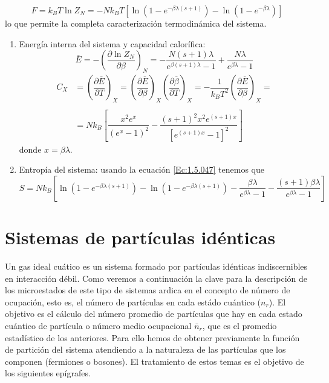 \documentclass[12pt,a4paper]{article}
\numberwithin{equation}{section}
\numberwithin{figure}{section}
\newcommand{\parentesis}[1]{\left( #1  \right)}
\newcommand{\parciales}[2]{\frac{\partial #1}{\partial #2}}
\newcommand{\dparciales}[2]{\dfrac{\partial #1}{\partial #2}}
\newcommand{\ccorchetes}[1]{\left[ #1  \right]}
\theoremstyle{definition}
\begin{document}
\begin{equation}
F = k_B T \ln Z_N = - N k_B T \ccorchetes{\ln \parentesis{1-e^{-\beta \lambda (s+1)}} -  \ln \parentesis{1-e^{-\beta \lambda}}}
\end{equation}
lo que permite la completa caracterización termodinámica del sistema. \\

\begin{enumerate}
\item Energía interna del sistema y capacidad calorífica:
\begin{equation}
\overline{E} = - \parentesis{\parciales{\ln Z_N}{\beta}}_N = - \frac{N(s+1) \lambda}{e^{\beta (s+1) \lambda} - 1 } + \frac{N \lambda}{e^{\beta \lambda}-1}
\end{equation}
\begin{equation}  \begin{array}{ll}
C_X & =  \parentesis{\dparciales{\overline{E}}{T}}_X =  \parentesis{\dparciales{\overline{E}}{\beta}}_X \parentesis{\dparciales{\overline{\beta}}{T}}_X = 
- \dfrac{1}{k_B T^2} \parentesis{\dparciales{\overline{E}}{\beta}}_X = \\ \\ & = Nk_B \ccorchetes{\dfrac{x^2 e^x}{(e^x - 1)^2} - \dfrac{(s+1)^2 x^2 e^{(s+1)x}}{\ccorchetes{e^{(s+1)x}-1}^2} } 
\end{array}
\end{equation}
donde $x=\beta \lambda$. 

\item Entropía del sistema: usando la ecuación \ref{Ec:1.5.047} tenemos que
\begin{equation}
S = N k_B \ccorchetes{\ln \parentesis{1-e^{-\beta \lambda (s+1)}}- \ln \parentesis{1-e^{-\beta \lambda (s+1)}}- \frac{\beta \lambda}{e^{\beta \lambda}-1} - \frac{(s+1)\beta \lambda}{e^{\beta \lambda}-1} }
\end{equation}
\end{enumerate}

\newpage

\section{Sistemas de partículas idénticas} \label{Sec:3}

Un gas ideal cuático es un sistema formado por partículas idénticas indiscernibles en interacción débil. Como veremos a continuación la clave para la descripción de los microestados de este tipo de sistemas ardica en el concepto de número de ocupación, esto es, el número de partículas en cada estádo cuántico ($n_r$). El objetivo es el cálculo del número promedio de partículas que hay en cada estado cuántico de partícula o número medio ocupacional $\bar{n}_r$, que es el promedio estadístico de los anteriores. Para ello hemos de obtener previamente la función de partición del sistema atendiendo a la naturaleza de las partículas que los componen (fermiones o bosones). El tratamiento de estos temas es el objetivo de los siguientes epígrafes. \\
\end{document}
